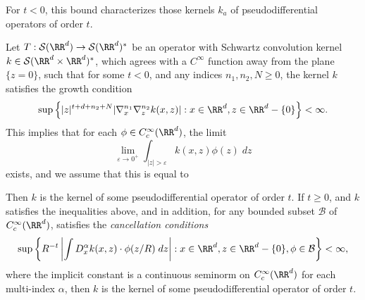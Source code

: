 For $t < 0$, this bound characterizes those kernels $k_a$ of pseudodifferential operators of order $t$.

\begin{lemma}
    Let $T: \mathcal{S}(\RR^d) \to \mathcal{S}(\RR^d)^*$ be an operator with Schwartz convolution kernel $k \in \mathcal{S}(\RR^d \times \RR^d)^*$, which agrees with a $C^\infty$ function away from the plane $\{ z = 0 \}$, such that for some $t < 0$, and any indices $n_1,n_2,N \geq 0$, the kernel $k$ satisfies the growth condition
    \[ \sup \left\{ |z|^{t + d + n_2 + N} |\nabla^{n_1}_x \nabla^{n_2}_z k(x,z)| : x \in \RR^d, z \in \RR^d - \{ 0 \} \right\} < \infty. \]
    This implies that for each $\phi \in C_c^\infty(\RR^d)$, the limit
    \[ \lim_{\varepsilon \to 0^+} \int_{|z| > \varepsilon} k(x,z) \phi(z)\; dz \]
    exists, and we assume that this is equal to

    Then $k$ is the kernel of some pseudodifferential operator of order $t$. If $t \geq 0$, and $k$ satisfies the inequalities above, and in addition, for any bounded subset $\mathcal{B}$ of $C_c^\infty(\RR^d)$, satisfies the \emph{cancellation conditions}
    \[ \sup \left\{ R^{-t} \left| \int D^\alpha_x k(x,z) \cdot \phi(z/R)\; dz \right| : x \in \RR^d, z \in \RR^d - \{ 0 \}, \phi \in \mathcal{B} \right\} < \infty, \]
    where the implicit constant is a continuous seminorm on $C_c^\infty(\RR^d)$ for each multi-index $\alpha$, then $k$ is the kernel of some pseudodifferential operator of order $t$.
\end{lemma}
